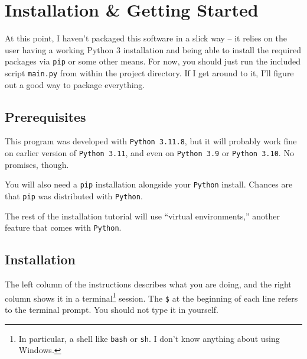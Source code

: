 \documentclass[11pt,letter]{article}
\begin{document}
\newpage

\appendix

\section{Installation \& Getting Started}

At this point, I haven't packaged this software in a slick way -- it relies on the user having a working Python 3 installation and being able to install the required packages via \texttt{pip} or some other means.
For now, you should just run the included script \texttt{main.py} from within the project directory.
If I get around to it, I'll figure out a good way to package everything.

\subsection{Prerequisites}

This program was developed with \texttt{Python 3.11.8}, but it will probably work fine on earlier version of \texttt{Python 3.11}, and even on \texttt{Python 3.9} or \texttt{Python 3.10}.
No promises, though.

You will also need a \texttt{pip} installation alongside your \texttt{Python} install.
Chances are that \texttt{pip} was distributed with \texttt{Python}.

The rest of the installation tutorial will use ``virtual environments,'' another feature that comes with \texttt{Python}.

\subsection{Installation}

The left column of the instructions describes what you are doing, and the right column shows it in a terminal\footnote{In particular, a shell like \texttt{bash} or \texttt{sh}. I don't know anything about using Windows.} session.
The \texttt{\$} at the beginning of each line refers to the terminal prompt.
You should not type it in yourself.
\end{document}
